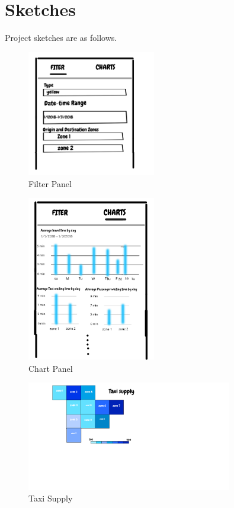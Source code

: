 \documentclass{article}
\begin{document}
        \section{Sketches}
            Project sketches are as follows.

            \begin{figure}[h!]
              \centering
              \includegraphics[width=0.5\textwidth]{sketch/filter.png}
              \caption{Filter Panel}
            \end{figure}   
            
            \begin{figure}[h!]
                \centering
                \includegraphics[width=0.5\textwidth]{sketch/chart.png}
                \caption{Chart Panel}
              \end{figure}  
            
              \begin{figure}[h!]
                \centering
                \includegraphics[width=0.8\textwidth]{sketch/taxi_supply.png}
                \caption{Taxi Supply}
              \end{figure} 
              
\end{document}
